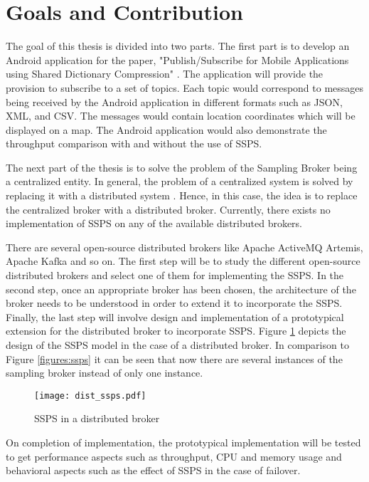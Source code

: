 \section{Goals and Contribution}

The goal of this thesis is divided into two parts. The first part is to develop an Android application for the paper, "Publish/Subscribe for Mobile Applications using Shared Dictionary Compression" \parencite{sdcdemo}. The application will provide the provision to subscribe to a set of topics. Each topic would correspond to messages being received by the Android application in different formats such as JSON, XML, and CSV. The messages would contain location coordinates which will be displayed on a map. The Android application would also demonstrate the throughput comparison with and without the use of SSPS.

The next part of the thesis is to solve the problem of the Sampling Broker being a centralized entity. In general, the problem of a centralized system is solved by replacing it with a distributed system \parencite{tanenbaum2007distributed}. Hence, in this case, the idea is to replace the centralized broker with a distributed broker. Currently, there exists no implementation of SSPS on any of the available distributed brokers.

There are several open-source distributed brokers like Apache ActiveMQ Artemis, Apache Kafka and so on. The first step will be to study the different open-source distributed brokers and select one of them for implementing the SSPS. In the second step, once an appropriate broker has been chosen, the architecture of the broker needs to be understood in order to extend it to incorporate the SSPS. Finally, the last step will involve design and implementation of a prototypical extension for the distributed broker to incorporate SSPS. Figure \ref{figures:dist_ssps} depicts the design of the SSPS model in the case of a distributed broker. In comparison to Figure \ref{figures:ssps} it can be seen that now there are several instances of the sampling broker instead of only one instance.

\makeatletter
\setlength{\@fptop}{0pt}
\makeatother

\begin{figure}[t!]
\centering
\texttt{[image: dist\_ssps.pdf]}
\caption{SSPS in a distributed broker}\label{figures:dist_ssps}
\end{figure}

On completion of implementation, the prototypical implementation will be tested to get performance aspects such as throughput, CPU and memory usage and behavioral aspects such as the effect of SSPS in the case of failover.

